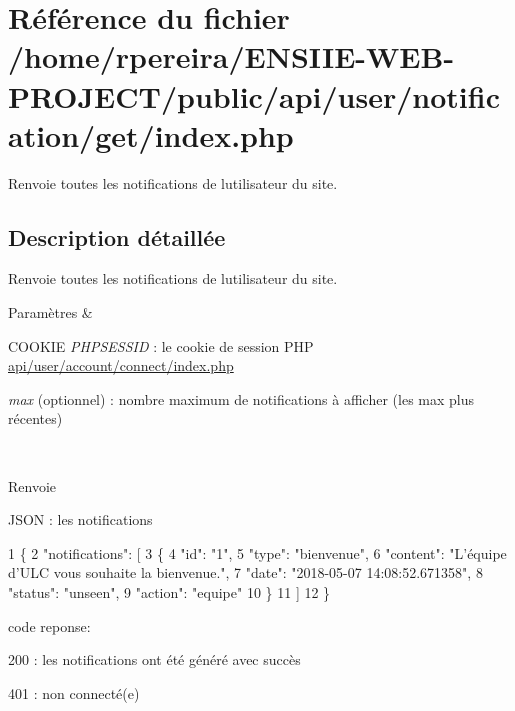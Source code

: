 \hypertarget{user_2notification_2get_2index_8php}{}\section{Référence du fichier /home/rpereira/\+E\+N\+S\+I\+I\+E-\/\+W\+E\+B-\/\+P\+R\+O\+J\+E\+C\+T/public/api/user/notification/get/index.php}
\label{user_2notification_2get_2index_8php}


Renvoie toutes les notifications de l\textquotesingle{}utilisateur du site.  




\subsection{Description détaillée}
Renvoie toutes les notifications de l\textquotesingle{}utilisateur du site. 


\begin{DoxyParams}{Paramètres}
{\em } & 
\begin{DoxyItemize}
\item C\+O\+O\+K\+IE {\itshape P\+H\+P\+S\+E\+S\+S\+ID} \+: le cookie de session P\+HP \hyperlink{user_2account_2connect_2index_8php}{api/user/account/connect/index.\+php}
\item {\itshape max} (optionnel) \+: nombre maximum de notifications à afficher (les \textquotesingle{}max\textquotesingle{} plus récentes) 
\end{DoxyItemize}\\
\hline
\end{DoxyParams}
\begin{DoxyReturn}{Renvoie}

\begin{DoxyItemize}
\item J\+S\+ON \+: les notifications 
\begin{DoxyCode}
1 \{
2     "notifications": [
3       \{
4             "id": "1",
5             "type": "bienvenue",
6             "content": "L'équipe d'ULC vous souhaite la bienvenue.",
7             "date": "2018-05-07 14:08:52.671358",
8             "status": "unseen",
9             "action": "equipe"
10         \}
11     ]
12 \}
\end{DoxyCode}

\item code reponse\+:
\begin{DoxyItemize}
\item 200 \+: les notifications ont été généré avec succès
\item 401 \+: non connecté(e) 
\end{DoxyItemize}
\end{DoxyItemize}
\end{DoxyReturn}
